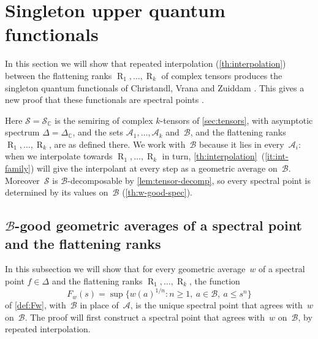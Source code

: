 \documentclass[11pt,letterpaper]{article}
\DeclareMathOperator{\tensorrank}{R}
\newcommand{\CC}{\mathbb{C}}
\begin{document}
\section{Singleton upper quantum functionals}\label{sec:qf}
In this section we will show that repeated interpolation (\cref{th:interpolation}) between the flattening ranks $\tensorrank_1, \ldots, \tensorrank_k$ of complex tensors produces the singleton quantum functionals of Christandl, Vrana and Zuiddam \cite{MR4495838}. This gives a new proof that these functionals are spectral points \cite[Corollary~3.31]{MR4495838}.

Here $\mathcal{S} = \mathcal{S}_\CC$ is the semiring of complex $k$-tensors of \cref{sec:tensors}, with asymptotic spectrum $\Delta = \Delta_\CC$, and the sets $\mathcal{A}_1, \ldots, \mathcal{A}_k$ and~$\mathcal{B}$, and the flattening ranks $\tensorrank_1, \ldots, \tensorrank_k$, are as defined there. We work with~$\mathcal{B}$ because it lies in every~$\mathcal{A}_i$: when we interpolate towards $\tensorrank_1, \ldots, \tensorrank_k$ in turn, \cref{th:interpolation}~(\ref{it:int-family}) will give the interpolant at every step as a geometric average on~$\mathcal{B}$. Moreover~$\mathcal{S}$ is $\mathcal{B}$-decomposable by \cref{lem:tensor-decomp}, so every spectral point is determined by its values on~$\mathcal{B}$ (\cref{th:w-good-spec}).

\subsection{\texorpdfstring{$\mathcal{B}$}{B}-good geometric averages of a spectral point and the flattening ranks}\label{sec:qf-averages}
In this subsection we will show that for every geometric average~$w$ of a spectral point $f \in \Delta$ and the flattening ranks $\tensorrank_1, \ldots, \tensorrank_k$, the function
\[
F_w(s) = \sup \{ w(a)^{1/n} : n \geq 1,\ a \in \mathcal{B},\ a \leq s^n \}
\]
of \cref{def:Fw}, with~$\mathcal{B}$ in place of~$\mathcal{A}$, is the unique spectral point that agrees with~$w$ on~$\mathcal{B}$. The proof will first construct a spectral point that agrees with~$w$ on~$\mathcal{B}$, by repeated interpolation.
\end{document}
